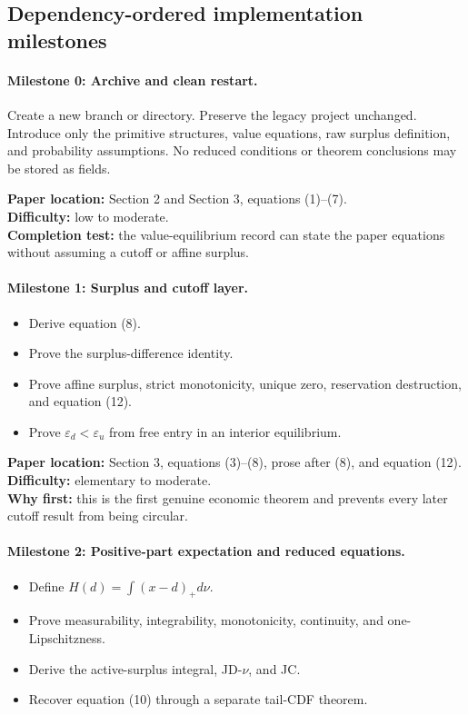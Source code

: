 \documentclass[11pt]{article}
\newcommand{\epsd}{\varepsilon_d}
\newcommand{\epsu}{\varepsilon_u}
\begin{document}
\subsection{Dependency-ordered implementation milestones}

\paragraph{Milestone 0: Archive and clean restart.}
Create a new branch or directory. Preserve the legacy project unchanged. Introduce only the primitive structures, value equations, raw surplus definition, and probability assumptions. No reduced conditions or theorem conclusions may be stored as fields.

\textbf{Paper location:} Section 2 and Section 3, equations (1)--(7). \\
\textbf{Difficulty:} low to moderate. \\
\textbf{Completion test:} the value-equilibrium record can state the paper equations without assuming a cutoff or affine surplus.

\paragraph{Milestone 1: Surplus and cutoff layer.}
\begin{itemize}
\item Derive equation (8).
\item Prove the surplus-difference identity.
\item Prove affine surplus, strict monotonicity, unique zero, reservation destruction, and equation (12).
\item Prove $\epsd<\epsu$ from free entry in an interior equilibrium.
\end{itemize}

\textbf{Paper location:} Section 3, equations (3)--(8), prose after (8), and equation (12). \\
\textbf{Difficulty:} elementary to moderate. \\
\textbf{Why first:} this is the first genuine economic theorem and prevents every later cutoff result from being circular.

\paragraph{Milestone 2: Positive-part expectation and reduced equations.}
\begin{itemize}
\item Define $H(d)=\int(x-d)_+d\nu$.
\item Prove measurability, integrability, monotonicity, continuity, and one-Lipschitzness.
\item Derive the active-surplus integral, JD-$\nu$, and JC.
\item Recover equation (10) through a separate tail-CDF theorem.
\end{itemize}
\end{document}
